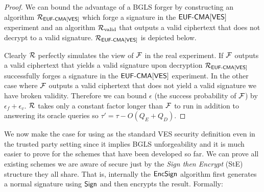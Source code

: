 \begin{proof}

  We can bound the advantage of a BGLS forger by constructing an algorithm $\mathcal{R}_{\textsf{EUF-CMA}[\textsf{VES}]}$ which forge a signature in the $\textsf{EUF-CMA}[\textsf{VES}]$ experiment and an algorithm $\mathcal{R}_{\text{valid}}$  that outputs a valid ciphertext that does not decrypt to a valid signature.
  $\mathcal{R}_{\textsf{EUF-CMA}[\textsf{VES}]}$ is depicted below.
\begin{center}
\end{center}


Clearly $\mathcal{R}$ perfectly simulates the view of $\mathcal{F}$ in the real experiment.
If $\mathcal{F}$ outputs a valid ciphertext that yields a valid signature upon decryption $\mathcal{R}_{\textsf{EUF-CMA}[\textsf{VES}]}$ successfully forges a signature in the $\textsf{EUF-CMA}[\textsf{VES}]$ experiment.
In the other case where $\mathcal{F}$ outputs a valid ciphertext that does not yield a valid signature we have broken validity.
Therefore we can bound $\epsilon$ (the success probability of $\mathcal{F}$) by $\epsilon_f + \epsilon_v$.
$\mathcal{R}$ takes only a constant factor longer than $\mathcal{F}$ to run in addition to answering its oracle queries so $\tau' = \tau - O(Q_E + Q_D)$.


\end{proof}

We now make the case for using \EUFCMAVES as the standard VES security definition even in the trusted party setting since it implies BGLS unforgeability and it is much easier to prove for the schemes that have been developed so far.
We can prove all existing schemes we are aware of \cite{Boneh:2003:AVE:1766171.1766207, Ruckert:2009:SVE:1615384.1615387, waters-ves, SHAO20081961, VES-structure-preserving} \EUFCMAVES secure just by the \emph{Sign then Encrypt} (StE) structure they all share.
That is, internally the $\textsf{EncSign}$ algorithm first generates a normal signature using $\textsf{Sign}$ and then encrypts the result. Formally:

